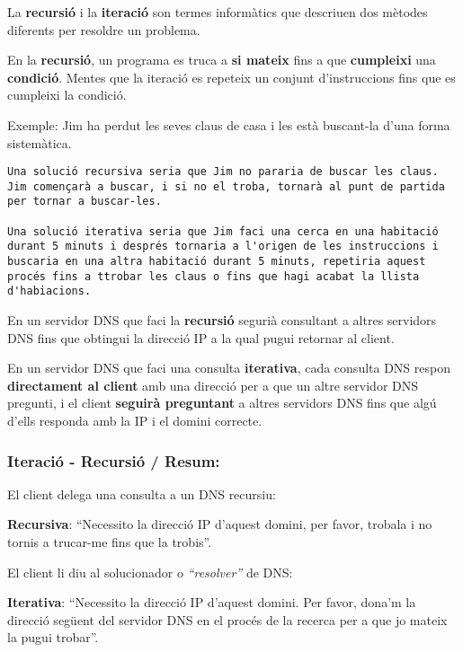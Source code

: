 \documentclass[]{article}
\begin{document}
La \textbf{recursió} i la \textbf{iteració} son termes informàtics que
descriuen dos mètodes diferents per resoldre un problema.

En la \textbf{recursió}, un programa es truca a \textbf{si mateix} fins
a que \textbf{cumpleixi} una \textbf{condició}. Mentes que la iteració
es repeteix un conjunt d'instruccions fins que es cumpleixi la condició.

Exemple: Jim ha perdut les seves claus de casa i les està buscant-la
d'una forma sistemàtica.

\begin{verbatim}
Una solució recursiva seria que Jim no pararia de buscar les claus. Jim començarà a buscar, i si no el troba, tornarà al punt de partida per tornar a buscar-les.

Una solució iterativa seria que Jim faci una cerca en una habitació durant 5 minuts i després tornaria a l'origen de les instruccions i buscaria en una altra habitació durant 5 minuts, repetiria aquest procés fins a ttrobar les claus o fins que hagi acabat la llista d'habiacions.
\end{verbatim}

En un servidor DNS que faci la \textbf{recursió} segurià consultant a
altres servidors DNS fins que obtingui la direcció IP a la qual pugui
retornar al client.

En un servidor DNS que faci una consulta \textbf{iterativa}, cada
consulta DNS respon \textbf{directament al client} amb una direcció per
a que un altre servidor DNS pregunti, i el client \textbf{seguirà
preguntant} a altres servidors DNS fins que algú d'ells responda amb la
IP i el domini correcte.

\hypertarget{iteraciuxf3---recursiuxf3-resum}{%
\subsubsection{\texorpdfstring{\textbf{Iteració - Recursió /
Resum:}}{Iteració - Recursió / Resum:}}\label{iteraciuxf3---recursiuxf3-resum}}

El client delega una consulta a un DNS recursiu:

\textbf{Recursiva}: ``Necessito la direcció IP d'aquest domini, per
favor, trobala i no tornis a trucar-me fins que la trobis''.

El client li diu al solucionador o \emph{``resolver''} de DNS:

\textbf{Iterativa}: ``Necessito la direcció IP d'aquest domini. Per
favor, dona'm la direcció següent del servidor DNS en el procés de la
recerca per a que jo mateix la pugui trobar''.
\end{document}
